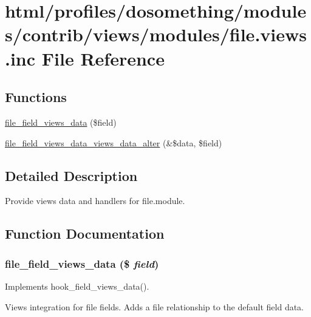 \hypertarget{file_8views_8inc}{
\section{html/profiles/dosomething/modules/contrib/views/modules/file.views.inc File Reference}
\label{file_8views_8inc}
}
\subsection*{Functions}
\begin{DoxyCompactItemize}
\item 
\hyperlink{file_8views_8inc_a86c31b4946a93801820aa2584fba800f}{file\_\-field\_\-views\_\-data} (\$field)
\item 
\hyperlink{file_8views_8inc_a79ca6a104321acf7e32c0f6d6950f70e}{file\_\-field\_\-views\_\-data\_\-views\_\-data\_\-alter} (\&\$data, \$field)
\end{DoxyCompactItemize}


\subsection{Detailed Description}
Provide views data and handlers for file.module. 

\subsection{Function Documentation}
\hypertarget{file_8views_8inc_a86c31b4946a93801820aa2584fba800f}{
\subsubsection[{file\_\-field\_\-views\_\-data}]{\setlength{\rightskip}{0pt plus 5cm}file\_\-field\_\-views\_\-data (\$ {\em field})}}
\label{file_8views_8inc_a86c31b4946a93801820aa2584fba800f}
Implements hook\_\-field\_\-views\_\-data().

Views integration for file fields. Adds a file relationship to the default field data.

